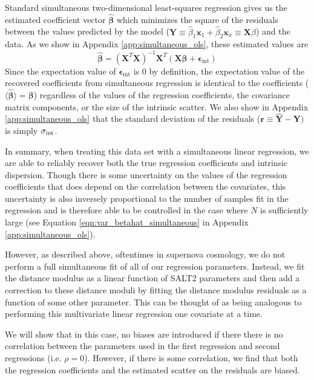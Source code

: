 Standard simultaneous two-dimensional least-squares regression gives us the estimated coefficient vector $\bm{\hat{\beta}}$ which minimizes the square of the residuals between the values predicted by the model ($\bm{\hat{Y}} \equiv \hat{\beta}_1\bm{x}_1 + \hat{\beta}_2\bm{x}_x \equiv \bm{X}\hat{\beta}$) and the data. As we show in Appendix \ref{app:simultaneous_ols}, these estimated values are
\begin{equation}
    \bm{\hat{\beta}} = (\bm{X}^T\bm{X})^{-1}\bm{X}^T(\bm{X\beta} + \bm{\epsilon}_\text{int})
\label{eqn:sim_beta_vec}
\end{equation}
Since the expectation value of $\bm{\epsilon}_\text{int}$ is 0 by definition, the expectation value of the recovered coefficients from simultaneous regression is identical to the coefficients ($\langle\bm{\hat{\beta}}\rangle=\bm{\beta}$) regardless of the values of the regression coefficients, the covariance matrix components, or the size of the intrinsic scatter. We also show in Appendix \ref{app:simultaneous_ols} that the standard deviation of the residuals ($\bm{r}\equiv\bm{\hat{Y}}-\bm{Y})$ is simply $\sigma_{\text{int}}$.

In summary, when treating this data set with a simultaneous linear regression, we are able to reliably recover both the true regression coefficients and intrinsic dispersion. Though there is some uncertainty on the values of the regression coefficients that does depend on the correlation between the covariates, this uncertainty is also inversely proportional to the number of samples fit in the regression and is therefore able to be controlled in the case where $N$ is sufficiently large (see Equation \ref{eqn:var_betahat_simultaneous} in Appendix \ref{app:simultaneous_ols}).

However, as described above, oftentimes in supernova cosmology, we do not perform a full simultaneous fit of all of our regression parameters. Instead, we fit the distance modulus as a linear function of SALT2 parameters and then add a correction to these distance moduli by fitting the distance modulus residuals as a function of some other parameter. This can be thought of as being analogous to performing this multivariate linear regression one covariate at a time.

We will show that in this case, no biases are introduced if there there is no correlation between the parameters used in the first regression and second regressions (i.e. $\rho=0$). However, if there is some correlation, we find that both the regression coefficients and the estimated scatter on the residuals are biased.

